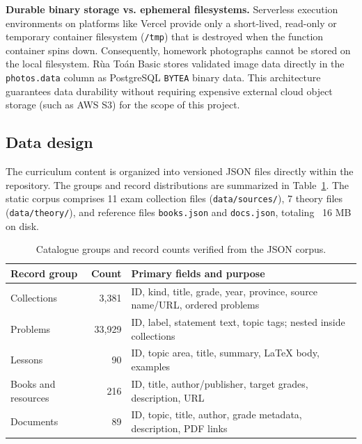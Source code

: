\textbf{Durable binary storage vs. ephemeral filesystems.}
Serverless execution environments on platforms like Vercel provide only a short-lived, read-only
or temporary container filesystem (\texttt{/tmp}) that is destroyed when the function container spins down.
Consequently, homework photographs cannot be stored on the local filesystem. Rùa Toán Basic stores
validated image data directly in the \texttt{photos.data} column as PostgreSQL \texttt{BYTEA} binary data.
This architecture guarantees data durability without requiring expensive external cloud object storage (such as AWS S3)
for the scope of this project.

\subsection{Data design}
The curriculum content is organized into versioned JSON files directly within the repository.
The groups and record distributions are summarized in Table~\ref{tab:data-groups}.
The static corpus comprises 11 exam collection files (\texttt{data/sources/}), 7 theory files
(\texttt{data/theory/}), and reference files \texttt{books.json} and \texttt{docs.json}, totaling ~16 MB on disk.

\begin{table}[ht]
\centering\small
\begin{tabularx}{\textwidth}{@{}l r >{\raggedright\arraybackslash}X@{}}
\toprule
\textbf{Record group} & \textbf{Count} & \textbf{Primary fields and purpose}\\
\midrule
Collections & 3,381 & ID, kind, title, grade, year, province, source name/URL, ordered problems\\
Problems & 33,929 & ID, label, statement text, topic tags; nested inside collections\\
Lessons & 90 & ID, topic area, title, summary, LaTeX body, examples\\
Books and resources & 216 & ID, title, author/publisher, target grades, description, URL\\
Documents & 89 & ID, topic, title, author, grade metadata, description, PDF links\\
\bottomrule
\end{tabularx}
\caption{Catalogue groups and record counts verified from the JSON corpus.}
\label{tab:data-groups}
\end{table}

